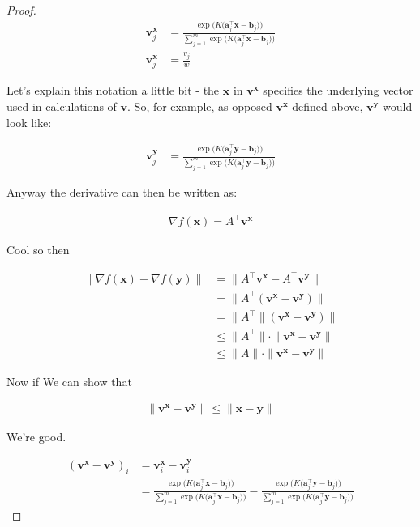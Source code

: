 \documentclass{article}
\begin{document}
\begin{proof}
	\begin{align}
		\mathbf{v}^\mathbf{x}_j &= \frac{\exp\big(K\big( \mathbf{a}_j^\top\mathbf{x} - \mathbf{b}_j\big) \big)}{\sum^m_{j=1}\exp\big(K\big( \mathbf{a}_j^\top\mathbf{x} - \mathbf{b}_j\big) \big)}\\
		\mathbf{v}^\mathbf{x}_j &= \frac{v_j}{w} 
	\end{align}
	
	Let's explain this notation a little bit - the $\mathbf{x}$ in $\mathbf{v}^\mathbf{x}$ specifies the underlying vector used in calculations of $\mathbf{v}$. So, for example, as opposed $\mathbf{v}^\mathbf{x}$ defined above, $\mathbf{v}^\mathbf{y}$ would look like:
	
	\begin{align}
		\mathbf{v}^\mathbf{y}_j &= \frac{\exp\big(K\big( \mathbf{a}_j^\top\mathbf{y} - \mathbf{b}_j\big) \big)}{\sum^m_{j=1}\exp\big(K\big( \mathbf{a}_j^\top\mathbf{y} - \mathbf{b}_j\big) \big)}
	\end{align}
	
	Anyway the derivative can then be written as:
	
	\begin{align}
		\nabla f(\mathbf{x}) = A^\top\mathbf{v}^\mathbf{x}
	\end{align}
	
	Cool so then
	
	\begin{align}
		\|\nabla f(\mathbf{x}) - \nabla f(\mathbf{y}) \| &= \|A^\top\mathbf{v}^\mathbf{x} - A^\top\mathbf{v}^\mathbf{y} \|\\
		&= \|A^\top(\mathbf{v}^\mathbf{x} - \mathbf{v}^\mathbf{y}) \|\\
		&= \|A^\top\|(\mathbf{v}^\mathbf{x} - \mathbf{v}^\mathbf{y}) \|\\
		&\le \|A^\top\|\cdot \|\mathbf{v}^\mathbf{x} - \mathbf{v}^\mathbf{y} \|\\
		&\le \|A\|\cdot \|\mathbf{v}^\mathbf{x} - \mathbf{v}^\mathbf{y} \|	
	\end{align}
	
	Now if We can show that
	
	\begin{align}
		 \|\mathbf{v}^\mathbf{x} - \mathbf{v}^\mathbf{y} \|	\le \|\mathbf{x} - \mathbf{y}\|
	\end{align}
	
	We're good. 
	
	\begin{align}
		(\mathbf{v}^\mathbf{x} - \mathbf{v}^\mathbf{y})_i &= \mathbf{v}_i^\mathbf{x} - \mathbf{v}_i^\mathbf{y}\\
		&=\frac{\exp\big(K\big( \mathbf{a}_j^\top\mathbf{x} - \mathbf{b}_j\big) \big)}{\sum^m_{j=1}\exp\big(K\big( \mathbf{a}_j^\top\mathbf{x} - \mathbf{b}_j\big) \big)} - \frac{\exp\big(K\big( \mathbf{a}_j^\top\mathbf{y} - \mathbf{b}_j\big) \big)}{\sum^m_{j=1}\exp\big(K\big( \mathbf{a}_j^\top\mathbf{y} - \mathbf{b}_j\big) \big)}
	\end{align}
	

\end{proof}
\end{document}

